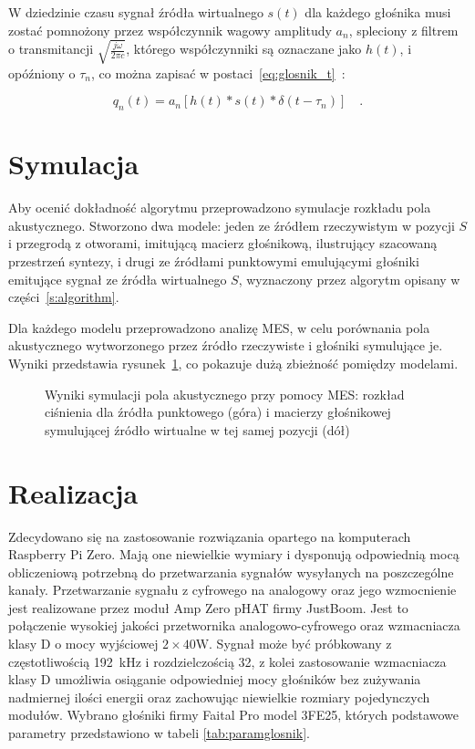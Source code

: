\documentclass[12pt]{oska}
\let\Oldsection\section
\renewcommand{\section}{\FloatBarrier\Oldsection}
\begin{document}
W dziedzinie czasu sygnał źródła wirtualnego $s(t)$ dla każdego głośnika musi zostać pomnożony
przez współczynnik wagowy amplitudy $a_n$, spleciony z filtrem o transmitancji 
$\sqrt{\frac{j\omega}{2\pi c}}$, którego współczynniki są oznaczane jako $h(t)$, i
opóźniony o $\tau_n$, co można zapisać w postaci~\eqref{eq:glosnik_t}~\cite{enhancement}:

\begin{equation}
  q_n(t) = a_n\left[h(t)*s(t)*\delta(t-\tau_n)\right] \quad. \label{eq:glosnik_t}
\end{equation}

\section{Symulacja}

Aby ocenić dokładność algorytmu przeprowadzono symulacje rozkładu pola akustycznego.
Stworzono dwa modele: jeden ze
źródłem rzeczywistym w pozycji $S$ i przegrodą z otworami, imitującą macierz
głośnikową, ilustrujący szacowaną przestrzeń syntezy, i drugi ze źródłami
punktowymi emulującymi głośniki emitujące sygnał ze źródła wirtualnego $S$,
wyznaczony przez algorytm opisany w części~\ref{s:algorithm}.

Dla każdego modelu przeprowadzono analizę MES, w celu porównania pola akustycznego
wytworzonego przez źródło rzeczywiste i głośniki
symulujące je. Wyniki przedstawia rysunek~\ref{r:fem}, co pokazuje dużą zbieżność
pomiędzy modelami.

\begin{figure}[!tbh]
  \centering
  \caption{Wyniki symulacji pola akustycznego przy pomocy MES:
    rozkład ciśnienia dla źródła punktowego (góra) i macierzy głośnikowej
  symulującej źródło wirtualne w tej samej pozycji (dół)}
  \label{r:fem}
\end{figure}


\section{Realizacja}

Zdecydowano się na zastosowanie rozwiązania opartego na komputerach Raspberry
Pi Zero. Mają one niewielkie wymiary i dysponują odpowiednią mocą obliczeniową potrzebną
do przetwarzania sygnałów wysyłanych na poszczególne kanały. Przetwarzanie
sygnału z cyfrowego na analogowy oraz jego wzmocnienie jest realizowane
przez moduł Amp Zero pHAT firmy JustBoom. Jest to połączenie wysokiej jakości
przetwornika analogowo-cyfrowego oraz wzmacniacza klasy D o mocy wyjściowej
$2\times40\si{\watt}$. Sygnał może być próbkowany z częstotliwością
\SI{192}{\kilo\hertz} i rozdzielczością \SI{32}{\bit}, z kolei zastosowanie
wzmacniacza klasy D umożliwia osiąganie odpowiedniej mocy głośników bez
zużywania nadmiernej ilości energii oraz zachowując niewielkie rozmiary
pojedynczych modułów. 
Wybrano głośniki firmy Faital Pro model 3FE25, których podstawowe parametry
przedstawiono w tabeli \ref{tab:paramglosnik}.
\end{document}
